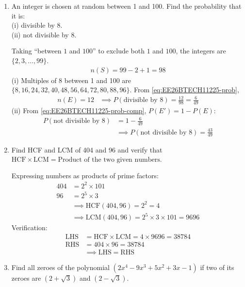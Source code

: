 \begin{enumerate}[label=\thesubsection.\arabic*, ref=\thesubsection.\theenumi]
    \item An integer is chosen at random between 1 and 100. Find the probability that it is: \\[2pt]
(i) divisible by 8. \\[2pt]
(ii) not divisible by 8.

\solution Taking ``between $1$ and $100$'' to exclude both $1$ and $100$, the integers are $\{2, 3, \dots, 99\}$.
\begin{align}
    n(S) = 99 - 2 + 1 = 98
\end{align}
(i) Multiples of 8 between 1 and 100 are $\{8, 16, 24, 32, 40, 48, 56, 64, 72, 80, 88, 96\}$. From \eqref{eq:EE26BTECH11225-prob},
\begin{align}
    n(E) = 12 &\implies P(\text{divisible by } 8) = \frac{12}{98} = \frac{6}{49}
\end{align}
(ii) From \eqref{eq:EE26BTECH11225-prob-comp}, $P(E') = 1 - P(E)$:
\begin{align}
    P(\text{not divisible by } 8) &= 1 - \frac{6}{49} \\
    &\implies P(\text{not divisible by } 8) = \frac{43}{49}
\end{align}
    \item Find HCF and LCM of 404 and 96 and verify that $\text{HCF} \times \text{LCM} = \text{Product of the two given numbers}$.

\solution Expressing numbers as products of prime factors:
\begin{align}
    404 &= 2^2 \times 101 \\
    96 &= 2^5 \times 3 \\
    &\implies \text{HCF}(404, 96) = 2^2 = 4 \\
    &\implies \text{LCM}(404, 96) = 2^5 \times 3 \times 101 = 9696
\end{align}
Verification:
\begin{align}
    \text{LHS} &= \text{HCF} \times \text{LCM} = 4 \times 9696 = 38784 \\
    \text{RHS} &= 404 \times 96 = 38784 \\
    &\implies \text{LHS} = \text{RHS}
\end{align}
    \item Find all zeroes of the polynomial $(2x^4 - 9x^3 + 5x^2 + 3x - 1)$ if two of its zeroes are $(2+\sqrt{3})$ and $(2-\sqrt{3})$.


\end{enumerate}
